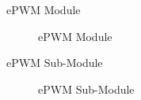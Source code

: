 
\begin{frame}{ePWM Module}
	\begin{figure}
		\centering


		\caption{ePWM Module}
	\end{figure}
\end{frame}



\begin{frame}{ePWM Sub-Module}
	\begin{figure}
		\centering
		\caption{ePWM Sub-Module}
	\end{figure}
\end{frame}



